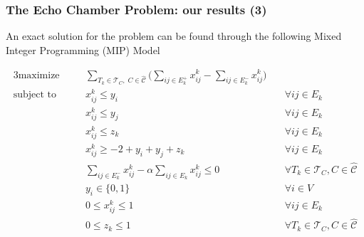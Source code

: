 \documentclass[aspectratio=169]{beamer}
\begin{document}
\begin{frame}[c]
	\frametitle{The Echo Chamber Problem: our results (3)}
	An exact solution for the problem can be found through the following Mixed
	Integer Programming (MIP) Model

		{\footnotesize
			\begin{alignat}{3}
				\label{eq:ecp-exact1}
				\text{maximize}     &                                                 & \sum_{ T_{k} \in \mathcal{T}_{C}, \; C \in
					\mathcal{\hat{C}} } \big( \sum^{}_{ij \in E^{+}_k } x_{ij}
				^{k} - \sum_{ij \in E^{-}_k } x_{ij} ^{k} \big)                                                                                                                                               \\
				\label{eq:ecp-v1}
				\text{subject to}   & \quad                                           & x _{ij}^{k}  \leq y_i                                               & \quad \forall ij \in E_k                        \\
				\label{eq:ecp-v2}
				                    &                                                 & x _{ij}^{k}  \leq y_j                                               & \quad \forall ij \in E_k                        \\
				\label{eq:ecp-t1}
				                    &                                                 & x _{ij}^{k}  \leq z_k                                               & \quad \forall ij \in E_k                        \\
				\label{eq:ecp-e1}
				                    &                                                 & x _{ij} ^{k} \geq - 2 + y_i + y_j + z_k                             & \quad \forall ij \in E_k                        \\
				\label{eq:ecp-alpha-constraint1}
				                    &                                                 & \sum^{}_{ij \in E_k^{-} } x_{ij}^{k}  - \alpha \sum^{}_{ij \in E_k}
				x_{ij} ^{k}  \leq 0 & \quad \forall T_{k} \in \mathcal{T} _{C}, C \in
				\hat{\mathcal{C}}                                                                                                                                                                             \\
				\label{eq:ecp-vertex-def1}
				                    &                                                 & y _{i} \in  \{0, 1\}                                                & \quad \forall i \in V                           \\
				\label{eq:ecp-edge-def1}
				                    &                                                 & 0 \leq x _{ij} ^{k}  \leq 1                                         & \quad \forall ij \in E_k                        \\
				\label{eq:ecp-thread-def1}
				                    &                                                 & 0 \leq z _{k} \leq 1                                                & \quad \forall T_{k} \in \mathcal{T} _{C}, C \in
				\hat{\mathcal{C}}
			\end{alignat}
		}

\end{frame}
\end{document}
